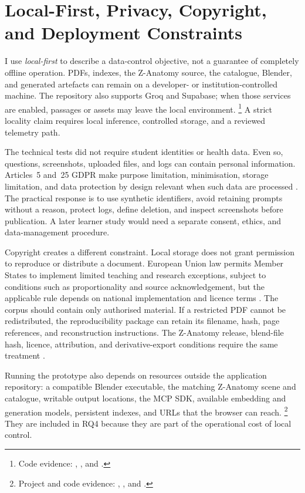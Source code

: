 \section{Local-First, Privacy, Copyright, and Deployment Constraints}
\label{sec:constraints}

I use \emph{local-first} to describe a data-control objective, not a guarantee of completely offline operation. PDFs, indexes, the Z-Anatomy source, the catalogue, Blender, and generated artefacts can remain on a developer- or institution-controlled machine. The repository also supports Groq and Supabase; when those services are enabled, passages or assets may leave the local environment.
\footnote{Code evidence: , , and .}
A strict locality claim requires local inference, controlled storage, and a reviewed telemetry path.

The technical tests did not require student identities or health data. Even so, questions, screenshots, uploaded files, and logs can contain personal information. Articles~5 and~25 GDPR make purpose limitation, minimisation, storage limitation, and data protection by design relevant when such data are processed \parencite{eu2016gdpr}. The practical response is to use synthetic identifiers, avoid retaining prompts without a reason, protect logs, define deletion, and inspect screenshots before publication. A later learner study would need a separate consent, ethics, and data-management procedure.

Copyright creates a different constraint. Local storage does not grant permission to reproduce or distribute a document. European Union law permits Member States to implement limited teaching and research exceptions, subject to conditions such as proportionality and source acknowledgement, but the applicable rule depends on national implementation and licence terms \parencite{eu2001infosoc}. The corpus should contain only authorised material. If a restricted PDF cannot be redistributed, the reproducibility package can retain its filename, hash, page references, and reconstruction instructions. The Z-Anatomy release, blend-file hash, licence, attribution, and derivative-export conditions require the same treatment \parencite{zanatomy}.

Running the prototype also depends on resources outside the application repository: a compatible Blender executable, the matching Z-Anatomy scene and catalogue, writable output locations, the MCP SDK, available embedding and generation models, persistent indexes, and URLs that the browser can reach.
\footnote{Project and code evidence: , , and .}
They are included in RQ4 because they are part of the operational cost of local control.

